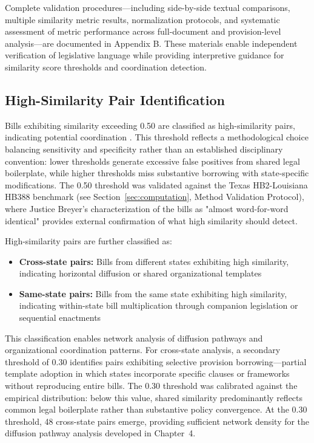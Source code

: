 Complete validation procedures---including side-by-side textual comparisons, multiple similarity metric results, normalization protocols, and systematic assessment of metric performance across full-document and provision-level analysis---are documented in Appendix B. These materials enable independent verification of legislative language while providing interpretive guidance for similarity score thresholds and coordination detection.

\subsection{High-Similarity Pair Identification}
Bills exhibiting similarity exceeding 0.50 are classified as high-similarity pairs, indicating potential coordination \parencite{jansaCopyPasteLawmaking2019}. This threshold reflects a methodological choice balancing sensitivity and specificity rather than an established disciplinary convention: lower thresholds generate excessive false positives from shared legal boilerplate, while higher thresholds miss substantive borrowing with state-specific modifications. The 0.50 threshold was validated against the Texas HB2-Louisiana HB388 benchmark (see Section~\ref{sec:computation}, Method Validation Protocol), where Justice Breyer's characterization of the bills as "almost word-for-word identical" provides external confirmation of what high similarity should detect.

High-similarity pairs are further classified as:
\begin{itemize}
    \item \textbf{Cross-state pairs:} Bills from different states exhibiting high similarity, indicating horizontal diffusion or shared organizational templates
    \item \textbf{Same-state pairs:} Bills from the same state exhibiting high similarity, indicating within-state bill multiplication through companion legislation or sequential enactments
\end{itemize}

This classification enables network analysis of diffusion pathways and organizational coordination patterns. For cross-state analysis, a secondary threshold of 0.30 identifies pairs exhibiting selective provision borrowing---partial template adoption in which states incorporate specific clauses or frameworks without reproducing entire bills. The 0.30 threshold was calibrated against the empirical distribution: below this value, shared similarity predominantly reflects common legal boilerplate rather than substantive policy convergence. At the 0.30 threshold, 48 cross-state pairs emerge, providing sufficient network density for the diffusion pathway analysis developed in Chapter~4.

